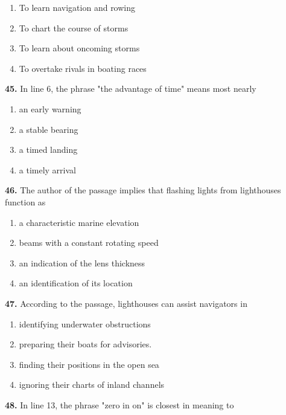 \documentclass[12pt]{article}
\begin{document}
\begin{enumerate}[label=(\Alph*),leftmargin=*,itemsep=0.2em]
\item To learn navigation and rowing
\item To chart the course of storms
\item To learn about oncoming storms
\item To overtake rivals in boating races
\end{enumerate}
\par
\vspace{0.25\baselineskip}
\noindent\textbf{45.} In line 6, the phrase "the advantage of time" means most nearly
\begin{enumerate}[label=(\Alph*),leftmargin=*,itemsep=0.2em]
\item an early warning
\item a stable bearing
\item a timed landing
\item a timely arrival
\end{enumerate}
\par
\vspace{0.25\baselineskip}
\noindent\textbf{46.} The author of the passage implies that flashing lights from lighthouses function as
\begin{enumerate}[label=(\Alph*),leftmargin=*,itemsep=0.2em]
\item a characteristic marine elevation
\item beams with a constant rotating speed
\item an indication of the lens thickness
\item an identification of its location
\end{enumerate}
\par
\vspace{0.25\baselineskip}
\noindent\textbf{47.} According to the passage, lighthouses can assist navigators in
\begin{enumerate}[label=(\Alph*),leftmargin=*,itemsep=0.2em]
\item identifying underwater obstructions
\item preparing their boats for advisories.
\item finding their positions in the open sea
\item ignoring their charts of inland channels
\end{enumerate}
\par
\vspace{0.25\baselineskip}
\noindent\textbf{48.} In line 13, the phrase "zero in on" is closest in meaning to
\end{document}
